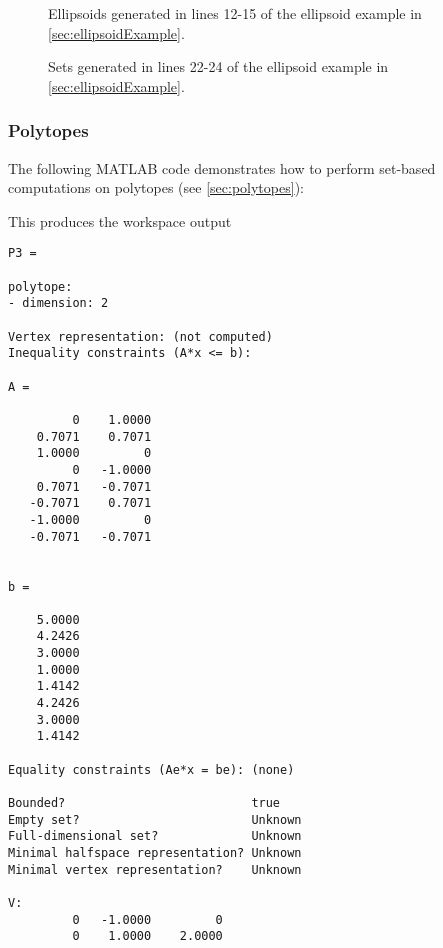 \begin{figure}[h!tb]
	\begin{minipage}{0.45\columnwidth}
		\centering
		\caption{Ellipsoids generated in lines 12-15 of the ellipsoid example in \cref{sec:ellipsoidExample}.}
		\label{fig:ellipsoidExample_1}
	\end{minipage}
	\hspace{0.08\columnwidth}
	\begin{minipage}{0.45\columnwidth}
		\centering
		\caption{Sets generated in lines 22-24 of the ellipsoid example in \cref{sec:ellipsoidExample}.}
		\label{fig:ellipsoidExample_2}
	\end{minipage}
\end{figure}





\newpage
\subsubsection{Polytopes}	\label{sec:polytopeExample}

The following MATLAB code demonstrates how to perform set-based computations on polytopes (see \cref{sec:polytopes}):

{\small
}

This produces the workspace output
\begin{verbatim}
P3 =

polytope:
- dimension: 2

Vertex representation: (not computed)
Inequality constraints (A*x <= b):

A =

         0    1.0000
    0.7071    0.7071
    1.0000         0
         0   -1.0000
    0.7071   -0.7071
   -0.7071    0.7071
   -1.0000         0
   -0.7071   -0.7071


b =

    5.0000
    4.2426
    3.0000
    1.0000
    1.4142
    4.2426
    3.0000
    1.4142

Equality constraints (Ae*x = be): (none)

Bounded?                          true
Empty set?                        Unknown
Full-dimensional set?             Unknown
Minimal halfspace representation? Unknown
Minimal vertex representation?    Unknown

V: 
         0   -1.0000         0
         0    1.0000    2.0000
\end{verbatim}


